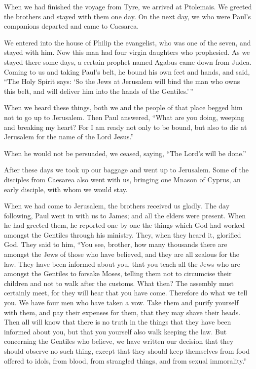  When we had finished the voyage from Tyre, we arrived at
Ptolemais. We greeted the brothers and stayed with them one day.
 On the next day, we who were Paul's companions departed and
came to Caesarea.

We entered into the house of Philip the evangelist, who was one of the
seven, and stayed with him.  Now this man had four virgin
daughters who prophesied.  As we stayed there some days, a
certain prophet named Agabus came down from Judea.  Coming
to us and taking Paul's belt, he bound his own feet and hands, and said,
``The Holy Spirit says: `So the Jews at Jerusalem will bind the man who
owns this belt, and will deliver him into the hands of the
Gentiles.'\,''

 When we heard these things, both we and the people of that
place begged him not to go up to Jerusalem.  Then Paul
answered, ``What are you doing, weeping and breaking my heart? For I am
ready not only to be bound, but also to die at Jerusalem for the name of
the Lord Jesus.''

 When he would not be persuaded, we ceased, saying, ``The
Lord's will be done.''

 After these days we took up our baggage and went up to
Jerusalem.  Some of the disciples from Caesarea also went
with us, bringing one Mnason of Cyprus, an early disciple, with whom we
would stay.

 When we had come to Jerusalem, the brothers received us
gladly.  The day following, Paul went in with us to James;
and all the elders were present.  When he had greeted them,
he reported one by one the things which God had worked amongst the
Gentiles through his ministry.  They, when they heard it,
glorified God. They said to him, ``You see, brother, how many thousands
there are amongst the Jews of those who have believed, and they are all
zealous for the law.  They have been informed about you,
that you teach all the Jews who are amongst the Gentiles to forsake
Moses, telling them not to circumcise their children and not to walk
after the customs.  What then? The assembly must certainly
meet, for they will hear that you have come.  Therefore do
what we tell you. We have four men who have taken a vow. 
Take them and purify yourself with them, and pay their expenses for
them, that they may shave their heads. Then all will know that there is
no truth in the things that they have been informed about you, but that
you yourself also walk keeping the law.  But concerning the
Gentiles who believe, we have written our decision that they should
observe no such thing, except that they should keep themselves from food
offered to idols, from blood, from strangled things, and from sexual
immorality.''

